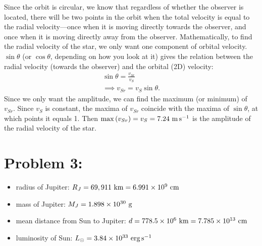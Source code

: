 \documentclass[11pt,letterpaper]{article}
\begin{document}
\begin{enumerate}[label=(\alph*)]
        Since the orbit is circular, we know that regardless of whether the observer is located, there will be two points in the orbit when the total velocity is equal to the radial velocity—once when it is moving directly towards the observer, and once when it is moving directly away from the observer. Mathematically, to find the radial velocity of the star, we only want one component of orbital velocity. $\sin{\theta}$ (or $\cos{\theta}$, depending on how you look at it) gives the relation between the radial velocity (towards the observer) and the orbital (2D) velocity:
        \begin{align*}
            \sin{\theta} = \frac{v_{Sr}}{v_S} \\
            \implies v_{Sr} = v_S\sin{\theta}.
        \end{align*}
        Since we only want the amplitude, we can find the maximum (or minimum) of $v_{Sr}$. Since $v_S$ is constant, the maxima of $v_{Sr}$ coincide with the maxima of $\sin{\theta}$, at which points it equals 1. Then $\max{(v_{Sr})} = v_S = 7.24~{\rm m\,s^{-1}}$ is the amplitude of the radial velocity of the star. 


\end{enumerate}




\section*{Problem 3:}
\begin{itemize}
    \item radius of Jupiter: $R_J = 69,911~{\rm km} = 6.991\times 10^{9}~{\rm cm}$
    \item mass of Jupiter: $M_J = 1.898\times 10^{30}~{\rm g}$
    \item mean distance from Sun to Jupiter: $d = 778.5 \times 10^{6}~{\rm km} = 7.785 \times 10^{13}~{\rm cm}$
    \item luminosity of Sun: $L_\odot = 3.84 \times 10^{33}~{\rm erg\,s^{-1}}$
\end{itemize}
\end{document}
